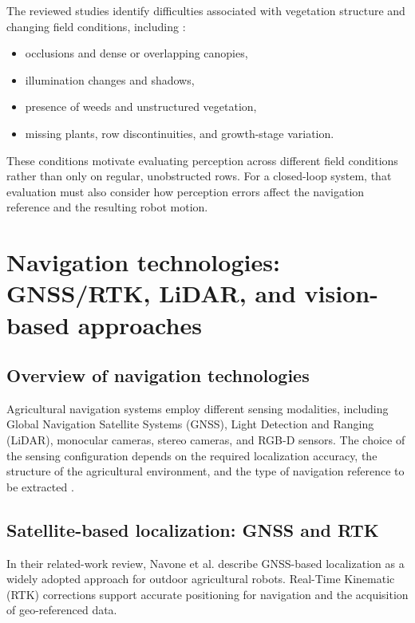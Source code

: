 The reviewed studies identify difficulties associated with vegetation
structure and changing field conditions, including
\cite{silva2023rowdetection,navone2025gpsfree}:
\begin{itemize}
    \item occlusions and dense or overlapping canopies,
    \item illumination changes and shadows,
    \item presence of weeds and unstructured vegetation,
    \item missing plants, row discontinuities, and growth-stage variation.
\end{itemize}
These conditions motivate evaluating perception across different field
conditions rather than only on regular, unobstructed rows. For a
closed-loop system, that evaluation must also consider how perception
errors affect the navigation reference and the resulting robot motion.

\section{Navigation technologies: GNSS/RTK, LiDAR, and vision-based approaches}
\label{sec:localizzazione}

\subsection{Overview of navigation technologies}
\label{subsec:overview_navigation_technologies}

Agricultural navigation systems employ different sensing modalities,
including Global Navigation Satellite Systems (GNSS), Light Detection
and Ranging (LiDAR), monocular cameras, stereo
cameras, and RGB-D sensors. The choice of the sensing configuration
depends on the required localization accuracy, the structure of the
agricultural environment, and the type of navigation reference to be
extracted \cite{bai2023vision}.

\subsection{Satellite-based localization: GNSS and RTK}
\label{subsec:gnss_rtk}

In their related-work review, Navone et al. describe GNSS-based
localization as a widely adopted approach for outdoor agricultural
robots. Real-Time Kinematic (RTK) corrections support accurate
positioning for navigation and the acquisition of geo-referenced data.

